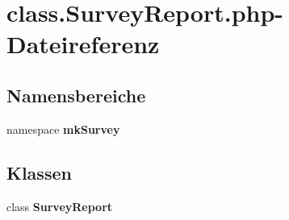 \section{class.SurveyReport.php-Dateireferenz}
\label{class_8SurveyReport_8php}
\subsection*{Namensbereiche}
\begin{CompactItemize}
\item 
namespace {\bf mkSurvey}
\end{CompactItemize}
\subsection*{Klassen}
\begin{CompactItemize}
\item 
class {\bf SurveyReport}
\end{CompactItemize}
